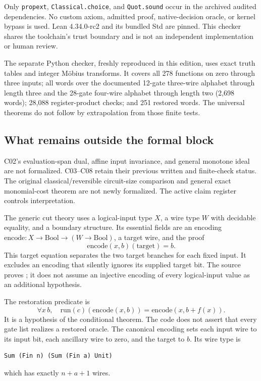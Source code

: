 Only \texttt{propext}, \texttt{Classical.choice}, and \texttt{Quot.sound} occur in the archived audited dependencies. No custom axiom, admitted proof, native-decision oracle, or kernel bypass is used. Lean 4.34.0-rc2 and its bundled Std are pinned. This checker shares the toolchain's trust boundary and is not an independent implementation or human review.

The separate Python checker, freshly reproduced in this edition, uses exact truth tables and integer M\"obius transforms. It covers all 278 functions on zero through three inputs; all words over the documented 12-gate three-wire alphabet through length three and the 28-gate four-wire alphabet through length two (2,698 words); 28,088 register-product checks; and 251 restored words. The universal theorems do not follow by extrapolation from those finite tests.

\subsection*{What remains outside the formal block}
C02's evaluation-span dual, affine input invariance, and general monotone ideal are not formalized. C03--C08 retain their previous written and finite-check status. The original classical/reversible circuit-size comparison and general exact monomial-cost theorem are not newly formalized. The active claim register controls interpretation.


The generic cut theory uses a logical-input type $X$, a wire type $W$ with
decidable equality, and a boundary structure. Its essential fields are an
encoding $\mathrm{encode}:X\to\mathrm{Bool}\to(W\to\mathrm{Bool})$, a target
wire, and the proof
\[
 \mathrm{encode}(x,b)(\mathrm{target})=b.
\]
This target equation separates the two target branches for each fixed input.
It excludes an encoding that silently ignores its supplied target bit.
The source proves ; it does not assume an
injective encoding of every logical-input value as an additional hypothesis.

The restoration predicate is
\[
 \forall x\,b,\quad \mathrm{run}(c)(\mathrm{encode}(x,b))
 =\mathrm{encode}(x,b+f(x)).
\]
It is a hypothesis of the conditional theorem. The code does not assert that
every gate list realizes a restored oracle. The canonical encoding sets each
input wire to its input bit, each ancillary wire to zero, and the target to $b$.
Its wire type is
\begin{lstlisting}
Sum (Fin n) (Sum (Fin a) Unit)
\end{lstlisting}
which has exactly $n+a+1$ wires.

